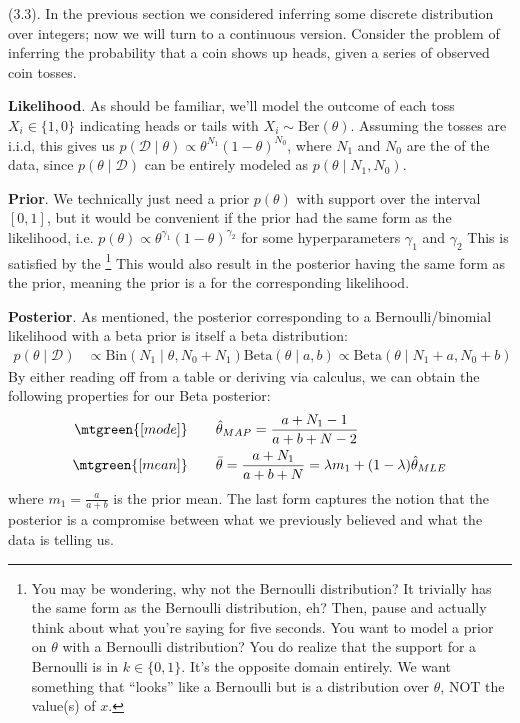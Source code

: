 \documentclass[11pt]{article}
\newcommand\myspace[1][]{\vspace{#1\bigskipamount}}
\newcommand\p{\Needspace{10\baselineskip} \noindent}
\begin{document}
\myspace
\p {} (3.3). In the previous section we considered inferring some discrete distribution over integers; now we will turn to a continuous version. Consider the problem of inferring the probability that a coin shows up heads, given a series of observed coin tosses. 
\begin{compactitem}
	\item \textbf{Likelihood}. As should be familiar, we'll model the outcome of each toss $X_i \in \{1, 0\}$ indicating heads or tails with $X_i \sim \text{Ber}(\theta)$. Assuming the tosses are i.i.d, this gives us $p(\mathcal D \mid \theta) \propto \theta^{N_1} (1 - \theta)^{N_0}$, where $N_1$ and $N_0$ are the  of the data, since $p(\theta \mid \mathcal D)$ can be entirely modeled as $p(\theta \mid N_1, N_0)$. 
	
	\item \textbf{Prior}. We technically just need a prior $p(\theta)$ with support over the interval $[0, 1]$, but it would be convenient if the prior had the same form as the likelihood, i.e. $p(\theta) \propto \theta^{\gamma_1} (1 - \theta)^{\gamma_2}$ for some hyperparameters $\gamma_1$ and $\gamma_2$ This is satisfied by the \footnote{You may be wondering, why not the Bernoulli distribution? It trivially has the same form as the Bernoulli distribution, eh? Then, pause and actually think about what you're saying for five seconds. You want to model a prior on $\theta$ with a Bernoulli distribution? You do realize that the support for a Bernoulli is in $k \in \{0, 1\}$. It's the opposite domain entirely. We want something that ``looks'' like a Bernoulli but is a distribution over $\theta$, NOT the value(s) of $x$.} This would also result in the posterior having the same form as the prior, meaning the prior is a  for the corresponding likelihood.
	
	\item \textbf{Posterior}. As mentioned, the posterior corresponding to a Bernoulli/binomial likelihood with a beta prior is itself a beta distribution:
	\begin{align}
		p(\theta \mid \mathcal D) 
			&\propto \text{Bin}(N_1 \mid \theta, N_0 + N_1) \text{Beta}(\theta \mid a, b)
			\propto \text{Beta}(\theta \mid N_1 + a, N_0 + b) 
	\end{align}
	By either reading off from a table or deriving via calculus, we can obtain the following properties for our Beta posterior:
	\begin{align}
		\mtgreen{[mode]}& \qquad \hat{\theta}_{MAP}
			= \frac{a + N_1 - 1}{a + b + N - 2} \\
		\mtgreen{[mean]}& \qquad \bar{\theta}
			= \frac{a + N_1}{a + b + N} = \lambda m_1 + (1 - \lambda) \hat{\theta}_{MLE}
	\end{align}
	where $m_1=\tfrac{a}{a+b}$ is the prior mean. The last form captures the notion that the posterior is a compromise between what we previously believed and what the data is telling us. 
\end{compactitem}
\end{document}
